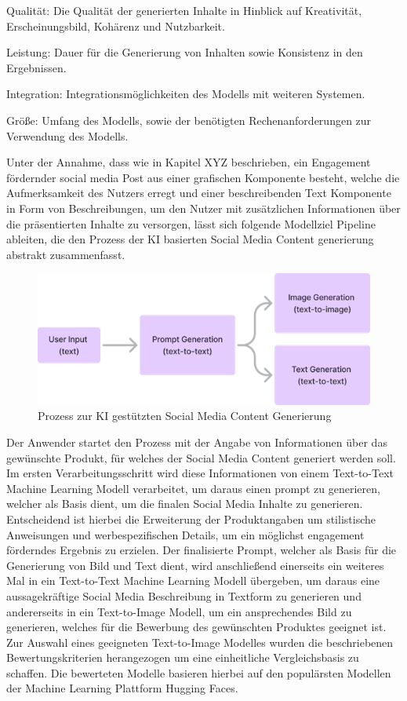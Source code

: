 Qualität: Die Qualität der generierten Inhalte in Hinblick auf Kreativität, Erscheinungsbild, Kohärenz und Nutzbarkeit.

Leistung: Dauer für die Generierung von Inhalten sowie Konsistenz in den Ergebnissen.

Integration: Integrationsmöglichkeiten des Modells mit weiteren Systemen.

Größe: Umfang des Modells, sowie der benötigten Rechenanforderungen zur Verwendung des Modells.

Unter der Annahme, dass wie in Kapitel XYZ beschrieben, ein Engagement fördernder social media Post aus einer grafischen Komponente besteht, welche die Aufmerksamkeit des Nutzers erregt und einer beschreibenden Text Komponente in Form von Beschreibungen, um den Nutzer mit zusätzlichen Informationen über die präsentierten Inhalte zu versorgen, lässt sich folgende Modellziel Pipeline ableiten, die den Prozess der KI basierten Social Media Content generierung abstrakt zusammenfasst.

\clearpage

\begin{figure}[htbp]
    \centering
    \includegraphics[width=\textwidth]{abbildungen/Process_image_generation}
    \caption{Prozess zur KI gestützten Social Media Content Generierung}
    \label{fig:process_content_generation}
\end{figure}


Der Anwender startet den Prozess mit der Angabe von Informationen über das gewünschte Produkt, für welches der Social Media Content generiert werden soll.
Im ersten Verarbeitungsschritt wird diese Informationen von einem Text-to-Text Machine Learning Modell verarbeitet, um daraus einen prompt zu generieren, welcher als Basis dient, um die finalen Social Media Inhalte zu generieren.
Entscheidend ist hierbei die Erweiterung der Produktangaben um stilistische Anweisungen und werbespezifischen Details, um ein möglichst engagement förderndes Ergebnis zu erzielen.
Der finalisierte Prompt, welcher als Basis für die Generierung von Bild und Text dient, wird anschließend einerseits ein weiteres Mal in ein Text-to-Text Machine Learning Modell übergeben, um daraus eine aussagekräftige Social Media Beschreibung in Textform zu generieren und andererseits in ein Text-to-Image Modell, um ein ansprechendes Bild zu generieren, welches für die Bewerbung des gewünschten Produktes geeignet ist.
Zur Auswahl eines geeigneten Text-to-Image Modelles wurden die beschriebenen Bewertungskriterien herangezogen um eine einheitliche Vergleichsbasis zu schaffen.
Die bewerteten Modelle basieren hierbei auf den populärsten Modellen der Machine Learning Plattform Hugging Faces.


